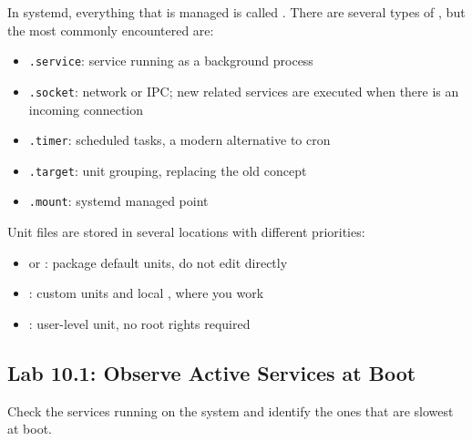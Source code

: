 In systemd, everything that is managed is called . There are several types of , but the most commonly encountered are:

\begin{itemize}
\item \texttt{.service}: service running as a background process
\item \texttt{.socket}:  network or IPC; new related services are executed when there is an incoming connection
\item \texttt{.timer}: scheduled tasks, a modern alternative to cron
\item \texttt{.target}: unit grouping, replacing the old  concept
\item \texttt{.mount}: systemd managed   point
\end{itemize}

Unit files are stored in several locations with different priorities:

\begin{itemize}
\item {} or : package default units, do not edit directly
\item {}: custom units and local , where you work
\item {}: user-level unit, no root rights required
\end{itemize}

\subsection*{Lab 10.1: Observe Active Services at Boot}

Check the services running on the system and identify the ones that are slowest at boot.

